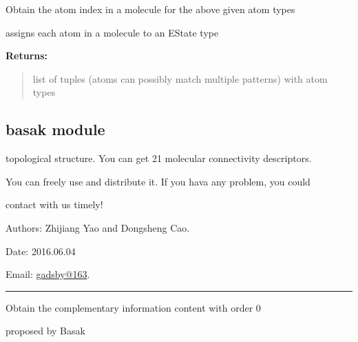 \documentclass[letterpaper,10pt,english]{sphinxmanual}
\begin{document}
\begin{fulllineitems}
\label{reference/AtomTypes:AtomTypes.GetAtomLabel}
Obtain the atom index in a molecule for the above given atom types

\end{fulllineitems}


\begin{fulllineitems}
\label{reference/AtomTypes:AtomTypes.TypeAtoms}
assigns each atom in a molecule to an EState type

\textbf{Returns:}
\begin{quote}

list of tuples (atoms can possibly match multiple patterns) with atom types
\end{quote}

\end{fulllineitems}



\subsection{basak module}
\label{reference/basak:module-basak}\label{reference/basak::doc}\label{reference/basak:basak-module}
topological structure. You can get 21 molecular connectivity descriptors.

You can freely use and distribute it. If you hava  any problem, you could

contact with us timely!

Authors: Zhijiang Yao and Dongsheng Cao.

Date: 2016.06.04

Email: \href{mailto:gadsby@163}{gadsby@163}.


\bigskip\hrule{}\bigskip


\begin{fulllineitems}
\label{reference/basak:basak.CalculateBasakCIC0}
Obtain the complementary information content with order 0

proposed by Basak

\end{fulllineitems}
\end{document}
